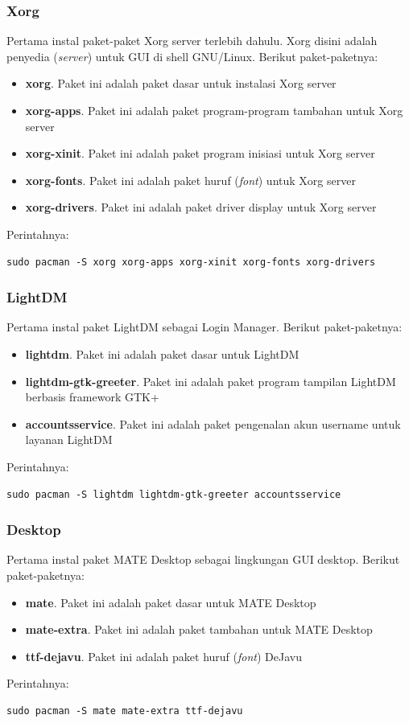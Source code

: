 \documentclass[12pt,]{article}
\begin{document}
	\subsubsection{Xorg}
	Pertama instal paket-paket Xorg server terlebih dahulu.
	Xorg disini adalah penyedia (\textit{server}) untuk GUI di shell GNU/Linux.
	Berikut paket-paketnya:
	\begin{itemize}
		\item \textbf{xorg}. Paket ini adalah paket dasar untuk instalasi Xorg server
		\item \textbf{xorg-apps}. Paket ini adalah paket program-program tambahan untuk Xorg server
		\item \textbf{xorg-xinit}. Paket ini adalah paket program inisiasi untuk Xorg server
		\item \textbf{xorg-fonts}. Paket ini adalah paket huruf (\textit{font}) untuk Xorg server
		\item \textbf{xorg-drivers}. Paket ini adalah paket driver display untuk Xorg server
	\end{itemize}
	Perintahnya:
	\begin{verbatim}
sudo pacman -S xorg xorg-apps xorg-xinit xorg-fonts xorg-drivers
	\end{verbatim}

	\subsubsection{LightDM}
	Pertama instal paket LightDM sebagai Login Manager.
	Berikut paket-paketnya:
	\begin{itemize}
		\item \textbf{lightdm}. Paket ini adalah paket dasar untuk LightDM
		\item \textbf{lightdm-gtk-greeter}. Paket ini adalah paket program tampilan LightDM berbasis framework GTK+
		\item \textbf{accountsservice}. Paket ini adalah paket pengenalan akun username untuk layanan LightDM
	\end{itemize}
	Perintahnya:
	\begin{verbatim}
sudo pacman -S lightdm lightdm-gtk-greeter accountsservice
	\end{verbatim}

	\subsubsection{Desktop}
	Pertama instal paket MATE Desktop sebagai lingkungan GUI desktop.
	Berikut paket-paketnya:
	\begin{itemize}
		\item \textbf{mate}. Paket ini adalah paket dasar untuk MATE Desktop
		\item \textbf{mate-extra}. Paket ini adalah paket tambahan untuk MATE Desktop
		\item \textbf{ttf-dejavu}. Paket ini adalah paket huruf (\textit{font}) DeJavu
	\end{itemize}
	Perintahnya:
	\begin{verbatim}
sudo pacman -S mate mate-extra ttf-dejavu
	\end{verbatim}
\end{document}
